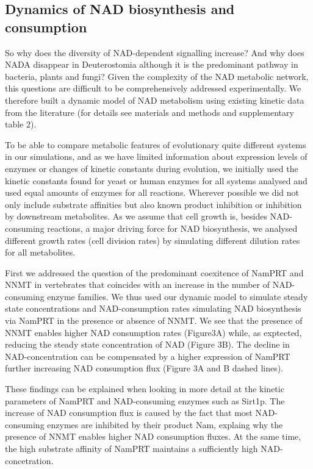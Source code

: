 \subsection{Dynamics of NAD biosynthesis and consumption}

So why does the diversity of NAD-dependent signalling increase? And why does NADA disappear in Deuterostomia although it is the predominant pathway in bacteria, plants and fungi? Given the complexity of the NAD metabolic network, this questions are difficult to be comprehensively addressed experimentally. We therefore built a dynamic model of NAD metabolism using existing kinetic data from the literature (for details see materials and methods and supplementary table 2).

To be able to compare metabolic features of evolutionary quite different systems in our simulations, and as we have limited information about expression levels of enzymes or changes of kinetic constants during evolution, we initially used the kinetic constants found for yeast or human enzymes for all systems analysed and used equal amounts of enzymes for all reactions. Wherever possible we did not only include substrate affinities but also known product inhibition or inhibition by downstream metabolites. As we assume that cell growth is, besides NAD-consuming reactions, a major driving force for NAD biosynthesis, we analysed different growth rates (cell division rates) by simulating different dilution rates for all metabolites.

First we addressed the question of the predominant coexitence of NamPRT and NNMT in vertebrates that coincides with an increase in the number of NAD-consuming enzyme families. We thus used our dynamic model to simulate steady state concentrations and NAD-consumption rates simulating NAD biosynthesis via  NamPRT in the  presence or absence of NNMT.  We see that the presence of NNMT enables higher NAD consumption rates  (Figure3A) while, as exptected, reducing the steady state concentration of NAD (Figure 3B). The decline in NAD-concentration can be compensated by a higher expression of NamPRT further increasing NAD consumption flux (Figure 3A and B dashed lines).

These findings can be explained when looking in more detail at the kinetic parameters of NamPRT and NAD-consuming enzymes such as Sirt1p.  The increase of NAD consumption flux is caused by the fact that most NAD-consuming enzymes are inhibited by their product Nam, explaing why the presence of NNMT enables higher NAD consumption fluxes. At the same time, the high substrate affinity of NamPRT maintains a sufficiently high NAD-concetration.

